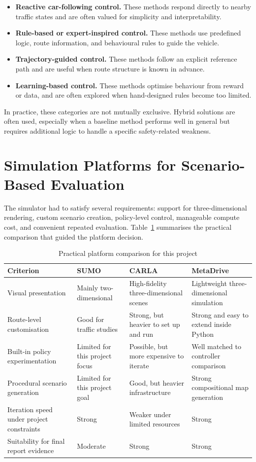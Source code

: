 \documentclass[12pt,a4paper]{report}
\begin{document}
\begin{itemize}
    \item \textbf{Reactive car-following control.} These methods respond directly to nearby traffic states and are often valued for simplicity and interpretability.
    \item \textbf{Rule-based or expert-inspired control.} These methods use predefined logic, route information, and behavioural rules to guide the vehicle.
    \item \textbf{Trajectory-guided control.} These methods follow an explicit reference path and are useful when route structure is known in advance.
    \item \textbf{Learning-based control.} These methods optimise behaviour from reward or data, and are often explored when hand-designed rules become too limited.
\end{itemize}

In practice, these categories are not mutually exclusive. Hybrid solutions are often used, especially when a baseline method performs well in general but requires additional logic to handle a specific safety-related weakness.

\section{Simulation Platforms for Scenario-Based Evaluation}
The simulator had to satisfy several requirements: support for three-dimensional rendering, custom scenario creation, policy-level control, manageable compute cost, and convenient repeated evaluation. Table~\ref{tab:platform_compare} summarises the practical comparison that guided the platform decision.

\begin{table}[H]
    \centering
    \small
    \caption{Practical platform comparison for this project}
    \label{tab:platform_compare}
    \begin{tabularx}{\textwidth}{>{\raggedright\arraybackslash}p{2.7cm} X X X}
        \toprule
        Criterion & SUMO & CARLA & MetaDrive \\
        \midrule
        Visual presentation & Mainly two-dimensional & High-fidelity three-dimensional scenes & Lightweight three-dimensional simulation \\
        Route-level customisation & Good for traffic studies & Strong, but heavier to set up and run & Strong and easy to extend inside Python \\
        Built-in policy experimentation & Limited for this project focus & Possible, but more expensive to iterate & Well matched to controller comparison \\
        Procedural scenario generation & Limited for this project goal & Good, but heavier infrastructure & Strong compositional map generation \\
        Iteration speed under project constraints & Strong & Weaker under limited resources & Strong \\
        Suitability for final report evidence & Moderate & Strong & Strong \\
        \bottomrule
    \end{tabularx}
\end{table}
\end{document}
